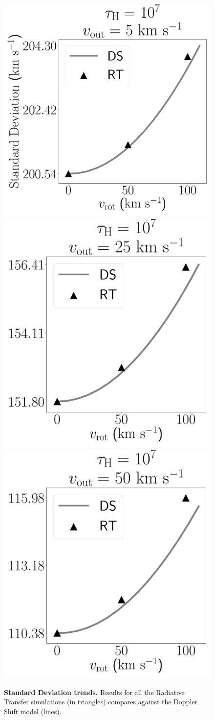 \documentclass[a4paper,fleqn,usenatbib]{mnras}
\begin{document}
\begin{figure}
\begin{center}
\includegraphics[height=0.27\textwidth]{./figures/results/line_characterization_std_vout5_logtau7.pdf}
\includegraphics[height=0.27\textwidth]{./figures/results/line_characterization_std_vout25_logtau7.pdf}
\includegraphics[height=0.27\textwidth]{./figures/results/line_characterization_std_vout50_logtau7.pdf}
\end{center}
\caption{\textbf{Standard Deviation trends.} Results for all the
  Radiative Transfer simulations (in triangles) compares against the
  Doppler Shift model (lines).
  \label{fig:standard_deviation}}
\end{figure}
\end{document}
